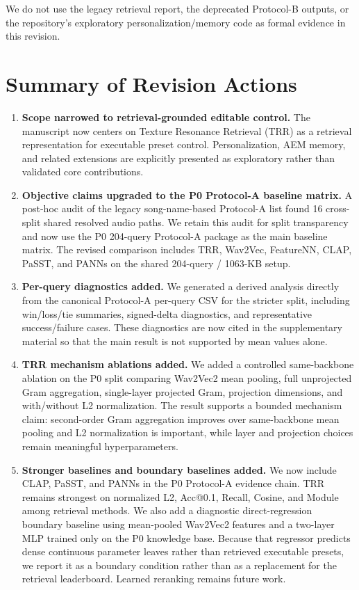 \documentclass[11pt,a4paper]{article}
\begin{document}
We do not use the legacy retrieval report, the deprecated Protocol-B outputs, or the repository's exploratory personalization/memory code as formal evidence in this revision.

\section*{Summary of Revision Actions}

\begin{enumerate}[leftmargin=2em]
    \item \textbf{Scope narrowed to retrieval-grounded editable control.} The manuscript now centers on Texture Resonance Retrieval (TRR) as a retrieval representation for executable preset control. Personalization, AEM memory, and related extensions are explicitly presented as exploratory rather than validated core contributions.

    \item \textbf{Objective claims upgraded to the P0 Protocol-A baseline matrix.} A post-hoc audit of the legacy song-name-based Protocol-A list found 16 cross-split shared resolved audio paths. We retain this audit for split transparency and now use the P0 204-query Protocol-A package as the main baseline matrix. The revised comparison includes TRR, Wav2Vec, FeatureNN, CLAP, PaSST, and PANNs on the shared 204-query / 1063-KB setup.

    \item \textbf{Per-query diagnostics added.} We generated a derived analysis directly from the canonical Protocol-A per-query CSV for the stricter split, including win/loss/tie summaries, signed-delta diagnostics, and representative success/failure cases. These diagnostics are now cited in the supplementary material so that the main result is not supported by mean values alone.

    \item \textbf{TRR mechanism ablations added.} We added a controlled same-backbone ablation on the P0 split comparing Wav2Vec2 mean pooling, full unprojected Gram aggregation, single-layer projected Gram, projection dimensions, and with/without L2 normalization. The result supports a bounded mechanism claim: second-order Gram aggregation improves over same-backbone mean pooling and L2 normalization is important, while layer and projection choices remain meaningful hyperparameters.

    \item \textbf{Stronger baselines and boundary baselines added.} We now include CLAP, PaSST, and PANNs in the P0 Protocol-A evidence chain. TRR remains strongest on normalized L2, Acc@0.1, Recall, Cosine, and Module among retrieval methods. We also add a diagnostic direct-regression boundary baseline using mean-pooled Wav2Vec2 features and a two-layer MLP trained only on the P0 knowledge base. Because that regressor predicts dense continuous parameter leaves rather than retrieved executable presets, we report it as a boundary condition rather than as a replacement for the retrieval leaderboard. Learned reranking remains future work.


\end{enumerate}
\end{document}
